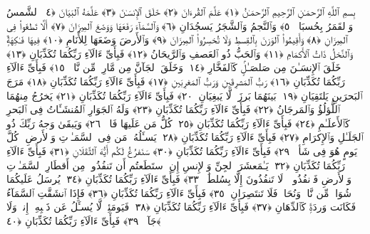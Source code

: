 
  
    
  
    
    

\nopagebreak
  بِسمِ ٱللَّهِ ٱلرَّحمَـٰنِ ٱلرَّحِيمِ
  ٱلرَّحمَـٰنُ ﴿١﴾
 عَلَّمَ ٱلقُرءَانَ ﴿٢﴾
 خَلَقَ ٱلإِنسَـٰنَ ﴿٣﴾
 عَلَّمَهُ ٱلبَيَانَ ﴿٤﴾
 ٱلشَّمسُ وَٱلقَمَرُ بِحُسبَانٍۢ ﴿٥﴾
 وَٱلنَّجمُ وَٱلشَّجَرُ يَسجُدَانِ ﴿٦﴾
 وَٱلسَّمَآءَ رَفَعَهَا وَوَضَعَ ٱلمِيزَانَ ﴿٧﴾
 أَلَّا تَطغَوا۟ فِى ٱلمِيزَانِ ﴿٨﴾
 وَأَقِيمُوا۟ ٱلوَزنَ بِٱلقِسطِ وَلَا تُخسِرُوا۟ ٱلمِيزَانَ ﴿٩﴾
 وَٱلأَرضَ وَضَعَهَا لِلأَنَامِ ﴿١٠﴾
 فِيهَا فَـٰكِهَةٌۭ وَٱلنَّخلُ ذَاتُ ٱلأَكمَامِ ﴿١١﴾
 وَٱلحَبُّ ذُو ٱلعَصفِ وَٱلرَّيحَانُ ﴿١٢﴾
 فَبِأَىِّ ءَالَآءِ رَبِّكُمَا تُكَذِّبَانِ ﴿١٣﴾
 خَلَقَ ٱلإِنسَـٰنَ مِن صَلصَـٰلٍۢ كَٱلفَخَّارِ ﴿١٤﴾
 وَخَلَقَ ٱلجَآنَّ مِن مَّارِجٍۢ مِّن نَّارٍۢ ﴿١٥﴾
 فَبِأَىِّ ءَالَآءِ رَبِّكُمَا تُكَذِّبَانِ ﴿١٦﴾
 رَبُّ ٱلمَشرِقَينِ وَرَبُّ ٱلمَغرِبَينِ ﴿١٧﴾
 فَبِأَىِّ ءَالَآءِ رَبِّكُمَا تُكَذِّبَانِ ﴿١٨﴾
 مَرَجَ ٱلبَحرَينِ يَلتَقِيَانِ ﴿١٩﴾
 بَينَهُمَا بَرزَخٌۭ لَّا يَبغِيَانِ ﴿٢٠﴾
 فَبِأَىِّ ءَالَآءِ رَبِّكُمَا تُكَذِّبَانِ ﴿٢١﴾
 يَخرُجُ مِنهُمَا ٱللُّؤلُؤُ وَٱلمَرجَانُ ﴿٢٢﴾
 فَبِأَىِّ ءَالَآءِ رَبِّكُمَا تُكَذِّبَانِ ﴿٢٣﴾
 وَلَهُ ٱلجَوَارِ ٱلمُنشَـَٔاتُ فِى ٱلبَحرِ كَٱلأَعلَـٰمِ ﴿٢٤﴾
 فَبِأَىِّ ءَالَآءِ رَبِّكُمَا تُكَذِّبَانِ ﴿٢٥﴾
 كُلُّ مَن عَلَيهَا فَانٍۢ ﴿٢٦﴾
 وَيَبقَىٰ وَجهُ رَبِّكَ ذُو ٱلجَلَـٰلِ وَٱلإِكرَامِ ﴿٢٧﴾
 فَبِأَىِّ ءَالَآءِ رَبِّكُمَا تُكَذِّبَانِ ﴿٢٨﴾
 يَسـَٔلُهُۥ مَن فِى ٱلسَّمَـٰوَٟتِ وَٱلأَرضِ ۚ كُلَّ يَومٍ هُوَ فِى شَأنٍۢ ﴿٢٩﴾
 فَبِأَىِّ ءَالَآءِ رَبِّكُمَا تُكَذِّبَانِ ﴿٣٠﴾
 سَنَفرُغُ لَكُم أَيُّهَ ٱلثَّقَلَانِ ﴿٣١﴾
 فَبِأَىِّ ءَالَآءِ رَبِّكُمَا تُكَذِّبَانِ ﴿٣٢﴾
 يَـٰمَعشَرَ ٱلجِنِّ وَٱلإِنسِ إِنِ ٱستَطَعتُم أَن تَنفُذُوا۟ مِن أَقطَارِ ٱلسَّمَـٰوَٟتِ وَٱلأَرضِ فَٱنفُذُوا۟ ۚ لَا تَنفُذُونَ إِلَّا بِسُلطَٰنٍۢ ﴿٣٣﴾
 فَبِأَىِّ ءَالَآءِ رَبِّكُمَا تُكَذِّبَانِ ﴿٣٤﴾
 يُرسَلُ عَلَيكُمَا شُوَاظٌۭ مِّن نَّارٍۢ وَنُحَاسٌۭ فَلَا تَنتَصِرَانِ ﴿٣٥﴾
 فَبِأَىِّ ءَالَآءِ رَبِّكُمَا تُكَذِّبَانِ ﴿٣٦﴾
 فَإِذَا ٱنشَقَّتِ ٱلسَّمَآءُ فَكَانَت وَردَةًۭ كَٱلدِّهَانِ ﴿٣٧﴾
 فَبِأَىِّ ءَالَآءِ رَبِّكُمَا تُكَذِّبَانِ ﴿٣٨﴾
 فَيَومَئِذٍۢ لَّا يُسـَٔلُ عَن ذَنۢبِهِۦٓ إِنسٌۭ وَلَا جَآنٌّۭ ﴿٣٩﴾
 فَبِأَىِّ ءَالَآءِ رَبِّكُمَا تُكَذِّبَانِ ﴿٤٠﴾
